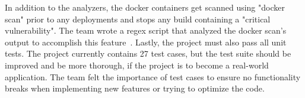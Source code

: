\vspace{3mm}

In addition to the analyzers, the docker containers get scanned using "docker scan" prior to any deployments and stops any build containing a "critical vulnerability". The team wrote a regex script that analyzed the docker scan's output to accomplish this feature~\cite{dockerScanner}. Lastly, the project must also pass all unit tests. The project currently contains 27 test cases, but the test suite should be improved and be more thorough, if the project is to become a real-world application. The team felt the importance of test cases to ensure no functionality breaks when implementing new features or trying to optimize the code.

